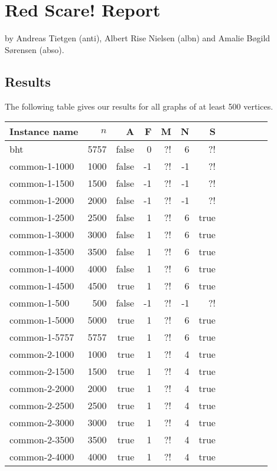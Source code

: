 \documentclass[a4paper]{article}
\begin{document}
\section{Red Scare! Report}

by Andreas Tietgen (anti), Albert Rise Nielsen (albn) and Amalie Bøgild Sørensen (abso).

\subsection{Results}

The following table gives our results for all graphs of at least 500 vertices.

\medskip
\begin{longtable}{lrrrrrrrrrrr}
\toprule
	Instance name & $n$ & A & F & M & N & S\\
	\midrule
	bht & 5757 & false & 0 & ?! & 6 & ?!\\
	common-1-1000 & 1000 & false & -1 & ?! & -1 & ?!\\
	common-1-1500 & 1500 & false & -1 & ?! & -1 & ?!\\
	common-1-2000 & 2000 & false & -1 & ?! & -1 & ?!\\
	common-1-2500 & 2500 & false & 1 & ?! & 6 & true\\
	common-1-3000 & 3000 & false & 1 & ?! & 6 & true\\
	common-1-3500 & 3500 & false & 1 & ?! & 6 & true\\
	common-1-4000 & 4000 & false & 1 & ?! & 6 & true\\
	common-1-4500 & 4500 & true & 1 & ?! & 6 & true\\
	common-1-500 & 500 & false & -1 & ?! & -1 & ?!\\
	common-1-5000 & 5000 & true & 1 & ?! & 6 & true\\
	common-1-5757 & 5757 & true & 1 & ?! & 6 & true\\
	common-2-1000 & 1000 & true & 1 & ?! & 4 & true\\
	common-2-1500 & 1500 & true & 1 & ?! & 4 & true\\
	common-2-2000 & 2000 & true & 1 & ?! & 4 & true\\
	common-2-2500 & 2500 & true & 1 & ?! & 4 & true\\
	common-2-3000 & 3000 & true & 1 & ?! & 4 & true\\
	common-2-3500 & 3500 & true & 1 & ?! & 4 & true\\
	common-2-4000 & 4000 & true & 1 & ?! & 4 & true\\

\end{longtable}
\end{document}
